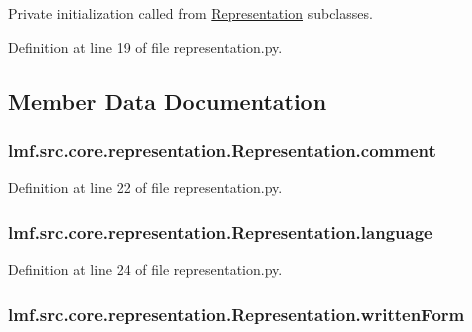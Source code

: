 Private initialization called from \hyperlink{classlmf_1_1src_1_1core_1_1representation_1_1_representation}{Representation} subclasses. 



Definition at line 19 of file representation.\+py.



\subsection{Member Data Documentation}
\hypertarget{classlmf_1_1src_1_1core_1_1representation_1_1_representation_a3442469787d13456fbaf6e5ee79037d5}{
\subsubsection[{comment}]{\setlength{\rightskip}{0pt plus 5cm}lmf.\+src.\+core.\+representation.\+Representation.\+comment}}\label{classlmf_1_1src_1_1core_1_1representation_1_1_representation_a3442469787d13456fbaf6e5ee79037d5}


Definition at line 22 of file representation.\+py.

\hypertarget{classlmf_1_1src_1_1core_1_1representation_1_1_representation_afc9334b238179d0a79d3ce1e13d4d304}{
\subsubsection[{language}]{\setlength{\rightskip}{0pt plus 5cm}lmf.\+src.\+core.\+representation.\+Representation.\+language}}\label{classlmf_1_1src_1_1core_1_1representation_1_1_representation_afc9334b238179d0a79d3ce1e13d4d304}


Definition at line 24 of file representation.\+py.

\hypertarget{classlmf_1_1src_1_1core_1_1representation_1_1_representation_a3966cc4e61369fde0e86dda8a656a0e1}{
\subsubsection[{written\+Form}]{\setlength{\rightskip}{0pt plus 5cm}lmf.\+src.\+core.\+representation.\+Representation.\+written\+Form}}\label{classlmf_1_1src_1_1core_1_1representation_1_1_representation_a3966cc4e61369fde0e86dda8a656a0e1}


